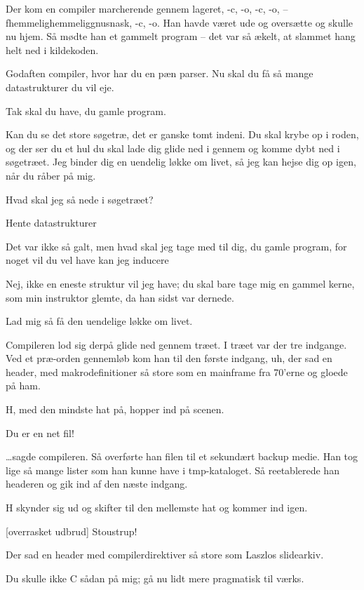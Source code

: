 \documentclass[danish]{article}
\begin{document}
\begin{sketch}
  
 Der kom en compiler marcherende gennem lageret, -c, -o, -c, -o,
--fhemmelighemmeliggnusnask, -c, -o. Han havde været ude og oversætte og skulle
nu hjem. Så mødte han et gammelt program -- det var så ækelt, at slammet hang
helt ned i kildekoden.

 Godaften compiler, hvor har du en pæn parser. Nu skal du få så mange
datastrukturer du vil eje.

 Tak skal du have, du gamle program.

 Kan du se det store søgetræ, det er ganske tomt indeni. Du skal krybe
op i roden, og der ser du et hul du skal lade dig glide ned i gennem og komme
dybt ned i søgetræet. Jeg binder dig en uendelig løkke om livet, så jeg kan
hejse dig op igen, når du råber på mig.

 Hvad skal jeg så nede i søgetræet?

 Hente datastrukturer

 Det var ikke så galt, men hvad skal jeg tage med til dig, du gamle
program, for noget vil du vel have kan jeg inducere

 Nej, ikke en eneste struktur vil jeg have; du skal bare tage mig en
gammel kerne, som min instruktor glemte, da han sidst var dernede.

 Lad mig så få den uendelige løkke om livet.

 Compileren lod sig derpå glide ned gennem træet. I træet var der tre
indgange. Ved et præ-orden gennemløb kom han til den første indgang, uh, der sad
en header, med makrodefinitioner så store som en mainframe fra 70'erne og gloede
på ham.

\scene H, med den mindste hat på, hopper ind på scenen.

 Du er en net fil!

 \ldots{}sagde compileren. Så overførte han filen til et sekundært
backup medie. Han tog lige så mange lister som han kunne have i tmp-kataloget.
Så reetablerede han headeren og gik ind af den næste indgang.

\scene H skynder sig ud og skifter til den mellemste hat og kommer ind igen.

[overrasket udbrud] Stoustrup!

 Der sad en header med compilerdirektiver så store som Laszlos
slidearkiv.

 Du skulle ikke C sådan på mig; gå nu lidt mere pragmatisk til værks.


\end{sketch}
\end{document}
